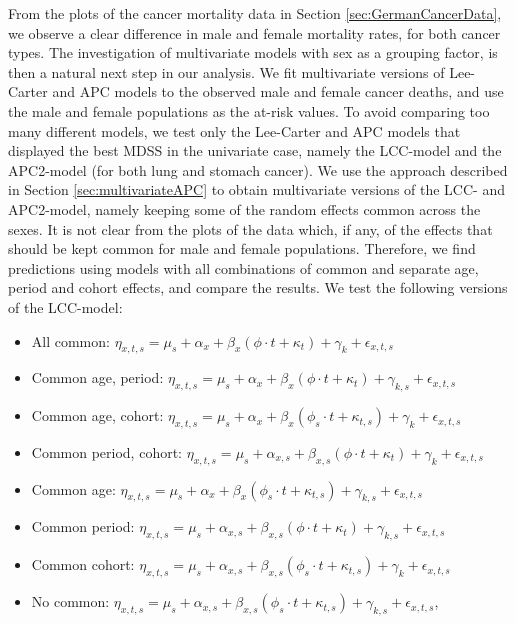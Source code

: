 From the plots of the cancer mortality data in Section \ref{sec:GermanCancerData}, we observe a clear difference in male and female mortality rates, for both cancer types. The investigation of multivariate models with sex as a grouping factor, is then a natural next step in our analysis. We fit multivariate versions of Lee-Carter and APC models to the observed male and female cancer deaths, and use the male and female populations as the at-risk values. To avoid comparing too many different models, we test only the Lee-Carter and APC models that displayed the best MDSS in the univariate case, namely the LCC-model and the APC2-model (for both lung and stomach cancer). We use the approach described in Section \ref{sec:multivariateAPC} to obtain multivariate versions of the LCC- and APC2-model, namely keeping some of the random effects common across the sexes. It is not clear from the plots of the data which, if any, of the effects that should be kept common for male and female populations. Therefore, we find predictions using models with all combinations of common and separate age, period and cohort effects, and compare the results. We test the following versions of the LCC-model:
\begin{itemize}
    \item All common: $\eta_{x,t,s} = \mu_s + \alpha_x + \beta_x(\phi\cdot t + \kappa_t) + \gamma_k + \epsilon_{x,t,s}$
    \item Common age, period: $\eta_{x,t,s} = \mu_s + \alpha_x + \beta_x(\phi\cdot t + \kappa_t) + \gamma_{k,s} + \epsilon_{x,t,s}$
    \item Common age, cohort: $\eta_{x,t,s} = \mu_s + \alpha_x + \beta_x(\phi_s\cdot t + \kappa_{t,s}) + \gamma_{k} + \epsilon_{x,t,s}$
    \item Common period, cohort: $\eta_{x,t,s} = \mu_s + \alpha_{x,s} + \beta_{x,s}(\phi\cdot t + \kappa_t) + \gamma_{k} + \epsilon_{x,t,s}$
    \item Common age: $\eta_{x,t,s} = \mu_s + \alpha_x + \beta_x(\phi_s\cdot t + \kappa_{t,s}) + \gamma_{k,s} + \epsilon_{x,t,s}$
    \item Common period: $\eta_{x,t,s} = \mu_s + \alpha_{x,s} + \beta_{x,s}(\phi\cdot t + \kappa_{t}) + \gamma_{k,s} + \epsilon_{x,t,s}$
    \item Common cohort: $\eta_{x,t,s} = \mu_s + \alpha_{x,s} + \beta_{x,s}(\phi_s\cdot t + \kappa_{t,s}) + \gamma_{k} + \epsilon_{x,t,s}$
    \item No common: $\eta_{x,t,s} = \mu_s + \alpha_{x,s} + \beta_{x,s}(\phi_s\cdot t + \kappa_{t,s}) + \gamma_{k,s} + \epsilon_{x,t,s}$,
\end{itemize}
